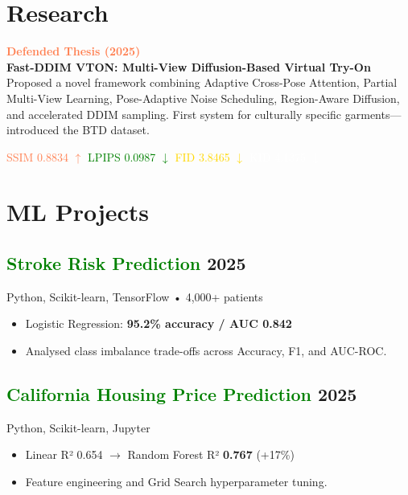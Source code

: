 \documentclass[11pt,a4paper]{article}
\begin{document}
\section{Research}
\begin{tcolorbox}[colback=navy2,coltext=white, colframe=coral, borderline west={4pt}{0pt}{coral}, sharp corners, boxrule=0pt]
    \textcolor{coral}{\textbf{Defended Thesis (2025)}} \\
    {\large \textbf{Fast-DDIM VTON: Multi-View Diffusion-Based Virtual Try-On}} \\
    Proposed a novel framework combining Adaptive Cross-Pose Attention, Partial Multi-View Learning, Pose-Adaptive Noise Scheduling, Region-Aware Diffusion, and accelerated DDIM sampling. First system for culturally specific garments—introduced the BTD dataset.
    
    \vspace{6pt}
    \textcolor{coral}{SSIM 0.8834 $\uparrow$} \hspace{8pt}
    \textcolor{green}{LPIPS 0.0987 $\downarrow$} \hspace{8pt}
    \textcolor{gold}{FID 3.8465 $\downarrow$} \hspace{8pt}
    \textcolor{white}{KID 4.1375 $\downarrow$}
\end{tcolorbox}

\section{ML Projects}

\subsection*{\textcolor{green}{Stroke Risk Prediction} \hfill \textcolor{muted}{2025}}
\textcolor{muted}{Python, Scikit-learn, TensorFlow • 4,000+ patients}
\begin{itemize}[leftmargin=*, label=\textcolor{coral}{\textendash}]
    \item Logistic Regression: \textbf{95.2\% accuracy / AUC 0.842}
    \item Analysed class imbalance trade-offs across Accuracy, F1, and AUC-ROC.
\end{itemize}

\subsection*{\textcolor{green}{California Housing Price Prediction} \hfill \textcolor{muted}{2025}}
\textcolor{muted}{Python, Scikit-learn, Jupyter}
\begin{itemize}[leftmargin=*, label=\textcolor{coral}{\textendash}]
    \item Linear R² 0.654 $\rightarrow$ Random Forest R² \textbf{0.767} (+17\%)
    \item Feature engineering and Grid Search hyperparameter tuning.
\end{itemize}
\end{document}
